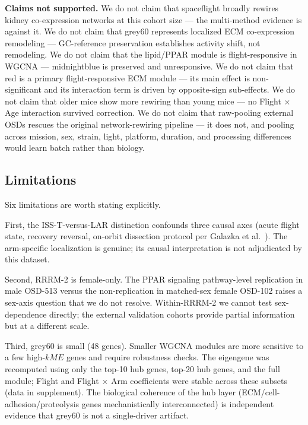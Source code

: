 \documentclass[11pt]{article}
\begin{document}
\textbf{Claims not supported.} We do not claim that spaceflight broadly rewires kidney co-expression networks at this cohort size --- the multi-method evidence is against it. We do not claim that grey60 represents localized ECM co-expression remodeling --- GC-reference preservation establishes activity shift, not remodeling. We do not claim that the lipid/PPAR module is flight-responsive in WGCNA --- midnightblue is preserved and unresponsive. We do not claim that red is a primary flight-responsive ECM module --- its main effect is non-significant and its interaction term is driven by opposite-sign sub-effects. We do not claim that older mice show more rewiring than young mice --- no Flight $\times$ Age interaction survived correction. We do not claim that raw-pooling external OSDs rescues the original network-rewiring pipeline --- it does not, and pooling across mission, sex, strain, light, platform, duration, and processing differences would learn batch rather than biology.

\subsection{Limitations}

Six limitations are worth stating explicitly.

First, the ISS-T-versus-LAR distinction confounds three causal axes (acute flight state, recovery reversal, on-orbit dissection protocol per Galazka et al.\ \citep{galazka2020rnaseq}). The arm-specific localization is genuine; its causal interpretation is not adjudicated by this dataset.

Second, RRRM-2 is female-only. The PPAR signaling pathway-level replication in male OSD-513 versus the non-replication in matched-sex female OSD-102 raises a sex-axis question that we do not resolve. Within-RRRM-2 we cannot test sex-dependence directly; the external validation cohorts provide partial information but at a different scale.

Third, grey60 is small (48 genes). Smaller WGCNA modules are more sensitive to a few high-$kME$ genes and require robustness checks. The eigengene was recomputed using only the top-10 hub genes, top-20 hub genes, and the full module; Flight and Flight $\times$ Arm coefficients were stable across these subsets (data in supplement). The biological coherence of the hub layer (ECM/cell-adhesion/proteolysis genes mechanistically interconnected) is independent evidence that grey60 is not a single-driver artifact.
\end{document}
